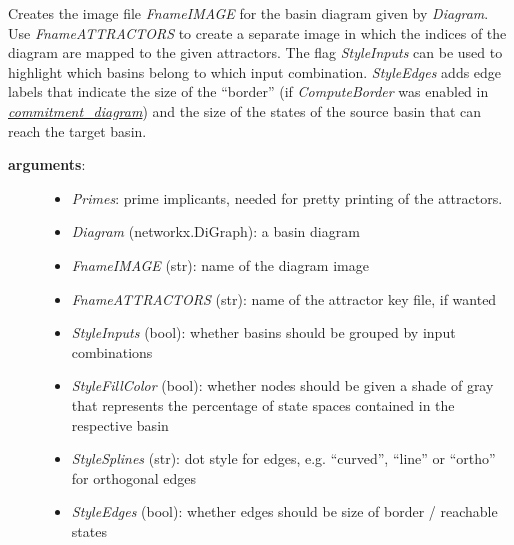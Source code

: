 \documentclass[letterpaper,10pt,english]{sphinxmanual}
\begin{document}
\begin{fulllineitems}
\label{AttractorBasins:PyBoolNet.AttractorBasins.diagram2image}
Creates the image file \emph{FnameIMAGE} for the basin diagram given by \emph{Diagram}.
Use \emph{FnameATTRACTORS} to create a separate image in which the indices of the diagram are mapped to the given attractors.
The flag \emph{StyleInputs} can be used to highlight which basins belong to which input combination.
\emph{StyleEdges} adds edge labels that indicate the size of the ``border'' (if \emph{ComputeBorder} was enabled in {\hyperref[AttractorBasins:commitment-diagram]{\emph{commitment\_diagram}}})
and the size of the states of the source basin that can reach the target basin.
\begin{description}
\item[{\textbf{arguments}:}] \leavevmode\begin{itemize}
\item {} 
\emph{Primes}: prime implicants, needed for pretty printing of the attractors.

\item {} 
\emph{Diagram} (networkx.DiGraph): a basin diagram

\item {} 
\emph{FnameIMAGE} (str): name of the diagram image

\item {} 
\emph{FnameATTRACTORS} (str): name of the attractor key file, if wanted

\item {} 
\emph{StyleInputs} (bool): whether basins should be grouped by input combinations

\item {} 
\emph{StyleFillColor} (bool): whether nodes should be given a shade of gray that represents the percentage of state spaces contained in the respective basin

\item {} 
\emph{StyleSplines} (str): dot style for edges, e.g. ``curved'', ``line'' or ``ortho'' for orthogonal edges

\item {} 
\emph{StyleEdges} (bool): whether edges should be size of border / reachable states


\end{itemize}
\end{description}
\end{fulllineitems}
\end{document}
